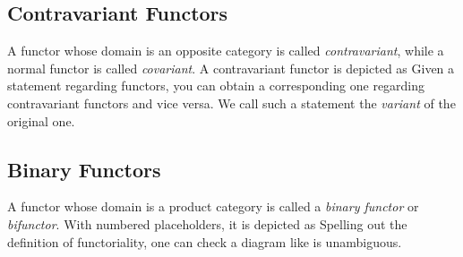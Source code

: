 \subsection{Contravariant Functors}

A functor whose domain is an opposite category
is called \emph{contravariant}, while a normal functor is called \emph{covariant}.
A contravariant functor is depicted as
Given a statement regarding functors, you can obtain a corresponding one regarding contravariant functors and vice versa. %
We call such a statement the \emph{variant} of the original one.


\subsection{Binary Functors}

A functor whose domain is a product category
is called a \emph{binary functor} or \emph{bifunctor}. With numbered placeholders, it is depicted as
Spelling out the definition of functoriality, one can check a diagram like
is unambiguous.

